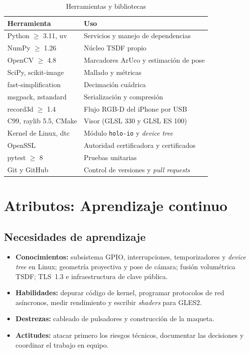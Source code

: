 \documentclass[journal]{IEEEtran}
\begin{document}
\begin{table}[!t]
\caption{Herramientas y bibliotecas}
\label{tab:software}
\centering
\footnotesize
\begin{tabularx}{\columnwidth}{lX}
\toprule
\textbf{Herramienta} & \textbf{Uso}\\
\midrule
Python $\geq$ 3.11, uv & Servicios y manejo de dependencias\\
NumPy $\geq$ 1.26 & Núcleo TSDF propio\\
OpenCV $\geq$ 4.8 & Marcadores ArUco y estimación de pose\\
SciPy, scikit-image & Mallado y métricas\\
fast-simplification & Decimación cuádrica\\
msgpack, zstandard & Serialización y compresión\\
record3d $\geq$ 1.4 & Flujo RGB-D del iPhone por USB \cite{record3d}\\
C99, raylib 5.5, CMake & Visor (GLSL 330 y GLSL ES 100) \cite{raylib}\\
Kernel de Linux, dtc & Módulo \texttt{holo-io} y \emph{device tree}\\
OpenSSL & Autoridad certificadora y certificados\\
pytest $\geq$ 8 & Pruebas unitarias\\
Git y GitHub & Control de versiones y \emph{pull requests}\\
\bottomrule
\end{tabularx}
\end{table}

\section{Atributos: Aprendizaje continuo}

\subsection{Necesidades de aprendizaje}
\begin{itemize}
  \item \textbf{Conocimientos:} subsistema GPIO, interrupciones, temporizadores y
        \emph{device tree} en Linux; geometría proyectiva y pose de cámara;
        fusión volumétrica TSDF; TLS~1.3 e infraestructura de clave pública.
  \item \textbf{Habilidades:} depurar código de kernel, programar protocolos de
        red asíncronos, medir rendimiento y escribir \emph{shaders} para GLES2.
  \item \textbf{Destrezas:} cableado de pulsadores y construcción de la maqueta.
  \item \textbf{Actitudes:} atacar primero los riesgos técnicos, documentar las
        decisiones y coordinar el trabajo en equipo.
\end{itemize}
\end{document}
